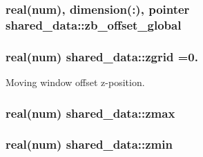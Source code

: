 \subsubsection[{\texorpdfstring{zb\+\_\+offset\+\_\+global}{zb_offset_global}}]{\setlength{\rightskip}{0pt plus 5cm}real(num), dimension(\+:), pointer shared\+\_\+data\+::zb\+\_\+offset\+\_\+global}\hypertarget{namespaceshared__data_afbe25de83b836cecc5e144cdee8fbb3e}{}\label{namespaceshared__data_afbe25de83b836cecc5e144cdee8fbb3e}
\subsubsection[{\texorpdfstring{zgrid}{zgrid}}]{\setlength{\rightskip}{0pt plus 5cm}real(num) shared\+\_\+data\+::zgrid =0.}\hypertarget{namespaceshared__data_aa22a8c4655934eea9cdf5b3c33ca9a33}{}\label{namespaceshared__data_aa22a8c4655934eea9cdf5b3c33ca9a33}


Moving window offset z-\/position. 

\subsubsection[{\texorpdfstring{zmax}{zmax}}]{\setlength{\rightskip}{0pt plus 5cm}real(num) shared\+\_\+data\+::zmax}\hypertarget{namespaceshared__data_aff54734070a6327d11c386fed6a31878}{}\label{namespaceshared__data_aff54734070a6327d11c386fed6a31878}
\subsubsection[{\texorpdfstring{zmin}{zmin}}]{\setlength{\rightskip}{0pt plus 5cm}real(num) shared\+\_\+data\+::zmin}\hypertarget{namespaceshared__data_aa449f330a5cea14b12af9b1a68766626}{}\label{namespaceshared__data_aa449f330a5cea14b12af9b1a68766626}
